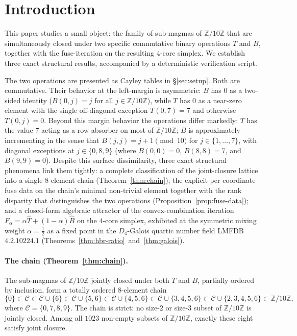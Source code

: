 \documentclass[11pt,reqno]{amsart}
\theoremstyle{plain}
\theoremstyle{definition}
\theoremstyle{remark}
\newcommand{\Z}{\mathbb{Z}}
\newcommand{\Zten}{\Z/10\Z}
\newcommand{\Cfour}{\mathcal{C}}
\newcommand{\Tfuse}{\widehat{T}}
\newcommand{\Bfuse}{\widehat{B}}
\begin{document}
\maketitle

\section{Introduction}\label{sec:intro}

This paper studies a small object: the family of sub-magmas of
$\Zten$ that are simultaneously closed under two specific
commutative binary operations $T$ and $B$, together with the
fuse-iteration on the resulting $4$-core simplex. We establish
three exact structural results, accompanied by a deterministic
verification script.

The two operations are presented as Cayley tables in
\S\ref{sec:setup}. Both are commutative. Their behavior at the
left-margin is asymmetric: $B$ has $0$ as a two-sided identity
($B(0, j) = j$ for all $j \in \Zten$), while $T$ has $0$ as a
near-zero element with the single off-diagonal exception
$T(0, 7) = 7$ and otherwise $T(0, j) = 0$. Beyond this margin
behavior the operations differ markedly: $T$ has the value $7$
acting as a row absorber on most of $\Zten$; $B$ is approximately
incrementing in the sense that $B(j,j) = j+1 \pmod{10}$ for
$j \in \{1,\dots,7\}$, with diagonal exceptions at
$j \in \{0,8,9\}$ (where $B(0,0)=0$, $B(8,8)=7$, and $B(9,9)=0$).
Despite this surface dissimilarity, three exact structural
phenomena link them tightly: a complete classification of the
joint-closure lattice into a single $8$-element chain
(Theorem~\ref{thm:chain}); the explicit per-coordinate fuse data
on the chain's minimal non-trivial element together with the
rank disparity that distinguishes the two operations
(Proposition~\ref{prop:fuse-data}); and a closed-form algebraic
attractor of the convex-combination iteration
$F_\alpha=\alpha\Tfuse+(1-\alpha)\Bfuse$ on the $4$-core simplex,
exhibited at the symmetric mixing weight $\alpha=\tfrac12$ as
a fixed point in the $D_4$-Galois quartic number field LMFDB~$4.2.10224.1$
(Theorems~\ref{thm:hbr-ratio}~and~\ref{thm:galois}).

\paragraph{The chain (Theorem~\ref{thm:chain}).} The sub-magmas of
$\Zten$ jointly closed under both $T$ and $B$, partially ordered
by inclusion, form a totally ordered $8$-element chain
\[
\{0\}\subset\Cfour\subset\Cfour\cup\{6\}\subset\Cfour\cup\{5,6\}\subset
\Cfour\cup\{4,5,6\}\subset\Cfour\cup\{3,4,5,6\}\subset
\Cfour\cup\{2,3,4,5,6\}\subset\Zten,
\]
where $\Cfour=\{0,7,8,9\}$. The chain is strict: no size-$2$ or
size-$3$ subset of $\Zten$ is jointly closed. Among all $1023$
non-empty subsets of $\Zten$, exactly these eight satisfy joint
closure.
\end{document}
